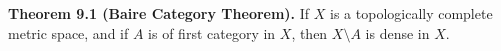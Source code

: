 \textbf{Theorem 9.1 (Baire Category Theorem).} If $X$ is a topologically complete metric space, and if $A$ is of first category in $X$, then $X \setminus A$ is dense in $X$.
